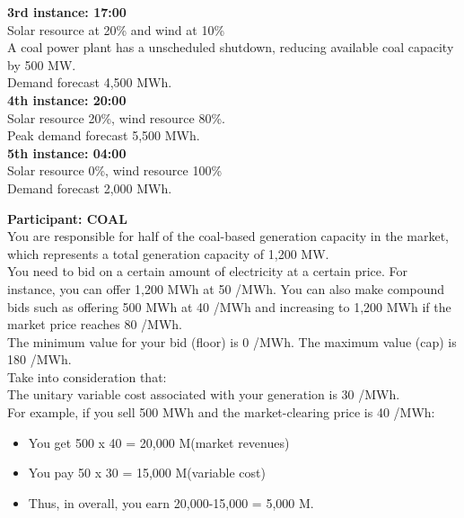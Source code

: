 \documentclass[3p]{elsarticle} %
\begin{document}
\textbf{3rd instance: 17:00 } \\
Solar resource at 20\% and wind at 10\% \\
A coal power plant has a unscheduled shutdown, reducing available coal capacity by 500 MW.\\
Demand forecast 4,500 MWh. \\

\textbf{4th instance: 20:00 } \\
Solar resource 20\%, wind resource 80\%. \\
Peak demand forecast 5,500 MWh. \\

\textbf{5th instance: 04:00} \\
Solar resource 0\%, wind resource 100\% \\
Demand forecast 2,000 MWh. \\

\newpage

\textbf{Participant: COAL} \\

You are responsible for half of the coal-based generation capacity in the market, which represents a total generation capacity of 1,200 MW. \\

You need to bid on a certain amount of electricity at a certain price. For instance, you can offer 1,200 MWh at 50 \EUR/MWh. You can also make compound bids such as offering 500 MWh at 40 \EUR/MWh and increasing to 1,200 MWh if the market price reaches 80 \EUR/MWh. \\

The minimum value for your bid (floor) is 0 \EUR/MWh. The maximum value (cap) is 180 \EUR/MWh. \\

Take into consideration that: \\

The unitary variable cost associated with your generation is 30 \EUR/MWh. \\

For example, if you sell 500 MWh and the market-clearing price is 40 \EUR/MWh:
\begin{itemize}
\item You get 500 x 40 = 20,000 M\EUR (market revenues)
\item You pay 50 x 30 = 15,000 M\EUR (variable cost)
\item Thus, in overall, you earn 20,000-15,000 = 5,000 M\EUR.
\end{itemize}
\end{document}

